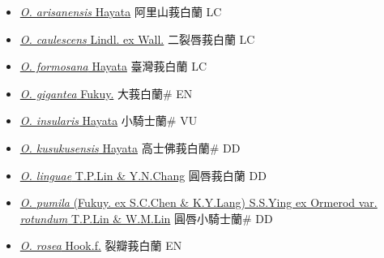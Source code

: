 \begin{itemize}
  \begin{itemize}
        \item[] \href{http://www.theplantlist.org/tpl1.1/search?q=Oberonia+arisanensis}{\textit{O. arisanensis} Hayata}   阿里山莪白蘭 LC
        \item[] \href{http://www.theplantlist.org/tpl1.1/search?q=Oberonia+caulescens}{\textit{O. caulescens} Lindl. ex Wall.}   二裂唇莪白蘭 LC
        \item[] \href{http://www.theplantlist.org/tpl1.1/search?q=Oberonia+formosana}{\textit{O. formosana} Hayata}     臺灣莪白蘭 LC
        \item[] \href{http://www.theplantlist.org/tpl1.1/search?q=Oberonia+gigantea}{\textit{O. gigantea} Fukuy.}   大莪白蘭\# EN
        \item[] \href{http://www.theplantlist.org/tpl1.1/search?q=Oberonia+insularis}{\textit{O. insularis} Hayata}     小騎士蘭\# VU
        \item[] \href{http://www.theplantlist.org/tpl1.1/search?q=Oberonia+kusukusensis}{\textit{O. kusukusensis} Hayata}   高士佛莪白蘭\# DD
        \item[] \href{http://www.theplantlist.org/tpl1.1/search?q=Oberonia+linguae}{\textit{O. linguae} T.P.Lin \& Y.N.Chang}   圓唇莪白蘭 DD
        \item[] \href{http://www.theplantlist.org/tpl1.1/search?q=Oberonia+pumila+var.+rotundum}{\textit{O. pumila} (Fukuy. ex S.C.Chen \& K.Y.Lang) S.S.Ying ex Ormerod var. \textit{rotundum} T.P.Lin \& W.M.Lin}   圓唇小騎士蘭\# DD
        \item[] \href{http://www.theplantlist.org/tpl1.1/search?q=Oberonia+rosea}{\textit{O. rosea} Hook.f.}   裂瓣莪白蘭 EN

\end{itemize}
\end{itemize}
